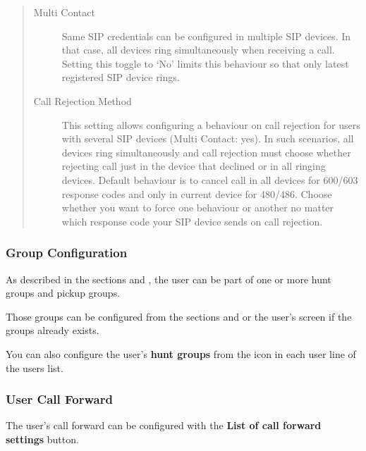 \documentclass[letterpaper,10pt,english]{sphinxmanual}
\begin{document}
\begin{quote}
\begin{description}
\item[{Multi Contact}] \leavevmode
Same SIP credentials can be configured in multiple SIP devices. In that case, all devices ring
simultaneously when receiving a call. Setting this toggle to `No' limits this behaviour so that
only latest registered SIP device rings.

\item[{Call Rejection Method}] \leavevmode
This setting allows configuring a behaviour on call rejection for users with several
SIP devices (Multi Contact: yes). In such scenarios, all devices ring simultaneously and call rejection must
choose whether rejecting call just in the device that declined or in all ringing devices.
Default behaviour is to cancel call in all devices for 600/603 response codes and only in
current device for 480/486. Choose whether you want to force one behaviour or another no
matter which response code your SIP device sends on call rejection.

\end{description}
\end{quote}


\subsubsection{Group Configuration}
\label{administration_portal/client/vpbx/users:group-configuration}
As described in the sections {\hyperref[administration_portal/client/vpbx/routing_endpoints/hunt_groups:huntgroups]{}} and {\hyperref[administration_portal/client/vpbx/user_configuration/pick_up_groups:capture\string-groups]{}}, the
user can be part of one or more hunt groups and pickup groups.

Those groups can be configured from the sections {\hyperref[administration_portal/client/vpbx/routing_endpoints/hunt_groups:huntgroups]{}} and
{\hyperref[administration_portal/client/vpbx/user_configuration/pick_up_groups:capture\string-groups]{}} or the user's screen if the groups already exists.

You can also configure the user's \textbf{hunt groups} from the icon in each user
line of the users list.


\subsubsection{User Call Forward}
\label{administration_portal/client/vpbx/users:user-call-forward}
The user's call forward can be configured with the \textbf{List of call forward settings}  button.
\end{document}
